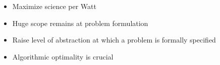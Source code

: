 \documentclass{beamer}
\begin{document}

\begin{frame}\LARGE
  \begin{itemize}
  \item Maximize science per Watt
  \item Huge scope remains at problem formulation
  \item Raise level of abstraction at which a problem is formally specified
  \item Algorithmic optimality is crucial
  \end{itemize}
\end{frame}
\end{document}
